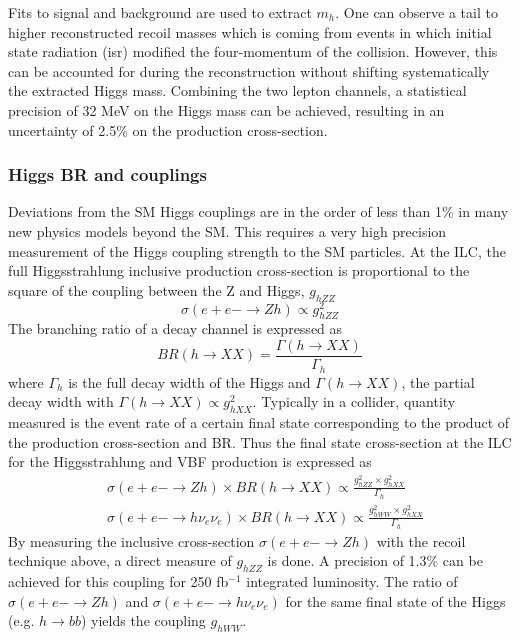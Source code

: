 Fits to signal and background are used to extract $m_h$. One can observe a tail to higher reconstructed recoil masses which is coming from events in which initial state radiation (\acrshort{isr}) modified the four-momentum of the collision. However, this can be accounted for during the reconstruction without shifting systematically the extracted Higgs mass. Combining the two lepton channels, a statistical precision of 32 MeV on the Higgs mass can be achieved, resulting in an uncertainty of 2.5\% on the production cross-section.

\subsubsection{Higgs BR and couplings}

Deviations from the SM Higgs couplings are in the order of less than 1\% in many new physics models beyond the SM. This requires a very high precision measurement of the Higgs coupling strength to the SM particles. At the ILC, the full Higgsstrahlung inclusive production cross-section is proportional to the square of the coupling between the Z and Higgs, $g_{hZZ}$
\begin{equation}
  \sigma(e+e- \rightarrow Zh) \propto g^2_{hZZ}
\end{equation}
The branching ratio of a decay channel is expressed as
\begin{equation}
  BR(h \rightarrow XX) = \frac{\Gamma(h \rightarrow XX)}{\Gamma_{h}}
\end{equation}
where $\Gamma_{h}$ is the full decay width of the Higgs and $\Gamma(h \rightarrow XX)$, the partial decay width with $\Gamma(h \rightarrow XX) \propto g^2_{hXX}$. Typically in a collider, quantity measured is the event rate of a certain final state corresponding to the product of the production cross-section and BR. Thus the final state cross-section at the ILC for the Higgsstrahlung and VBF production is expressed as
\begin{equation}
  \begin{aligned}
    &\sigma(e+e- \rightarrow Zh) \times BR(h \rightarrow XX) \propto \frac{g^2_{hZZ} \times g^2_{hXX}}{\Gamma_{h}}\\
    &\sigma(e+e- \rightarrow h\nu_e\nu_e) \times BR(h \rightarrow XX) \propto \frac{g^2_{hWW} \times g^2_{hXX}}{\Gamma_{h}}
  \end{aligned}
\end{equation}
By measuring the inclusive cross-section $\sigma(e+e- \rightarrow Zh)$ with the recoil technique above, a direct measure of $g_{hZZ}$ is done. A precision of 1.3\% can be achieved for this coupling for 250 fb$^{-1}$ integrated luminosity. The ratio of $\sigma(e+e- \rightarrow Zh)$ and $\sigma(e+e- \rightarrow h\nu_e\nu_e)$ for the same final state of the Higgs (e.g. $h \rightarrow bb$) yields the coupling $g_{hWW}$.

